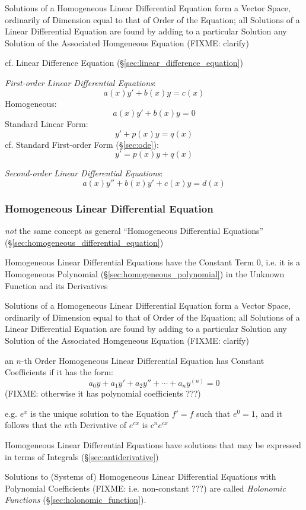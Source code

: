 Solutions of a Homogeneous Linear Differential Equation form a Vector Space,
ordinarily of Dimension equal to that of Order of the Equation; all Solutions
of a Linear Differential Equation are found by adding to a particular Solution
any Solution of the Associated Homgeneous Equation (FIXME: clarify)

cf. Linear Difference Equation (\S\ref{sec:linear_difference_equation})

\emph{First-order Linear Differential Equations}:
\[
  a(x) y' + b(x) y = c(x)
\]
Homogeneous:
\[
  a(x) y' + b(x) y = 0
\]
Standard Linear Form:
\[
  y' + p(x) y = q(x)
\]
cf. Standard First-order Form (\S\ref{sec:ode}):
\[
  y' = p(x) y + q(x)
\]

\emph{Second-order Linear Differential Equations}:
\[
  a(x) y'' + b(x) y' + c(x) y = d(x)
\]



\subsubsection{Homogeneous Linear Differential Equation}
\label{sec:homogeneous_linear_differential}

\emph{not} the same concept as general ``Homogeneous Differential Equations''
(\S\ref{sec:homogeneous_differential_equation})

Homogeneous Linear Differential Equations have the Constant Term $0$, i.e. it
is a Homogeneous Polynomial (\S\ref{sec:homogeneous_polynomial}) in the Unknown
Function and its Derivatives

Solutions of a Homogeneous Linear Differential Equation form a Vector Space,
ordinarily of Dimension equal to that of Order of the Equation; all Solutions
of a Linear Differential Equation are found by adding to a particular Solution
any Solution of the Associated Homgeneous Equation (FIXME: clarify)

an $n$-th Order Homogeneous Linear Differential Equation has Constant
Coefficients if it has the form:
\[
  a_0y + a_1y' + a_2y'' + \cdots + a_ny^{(n)} = 0
\]
(FIXME: otherwise it has polynomial coefficients ???)

e.g. $e^x$ is the unique solution to the Equation $f' = f$ such that $e^0 = 1$,
and it follows that the $n$th Derivative of $e^{cx}$ is $c^n e^{cx}$

Homogeneous Linear Differential Equations have solutions that may be expressed
in terms of Integrals (\S\ref{sec:antiderivative})

Solutions to (Systems of) Homogeneous Linear Differential Equations with
Polynomial Coefficients (FIXME: i.e. non-constant ???) are called
\emph{Holonomic Functions} (\S\ref{sec:holonomic_function}).


